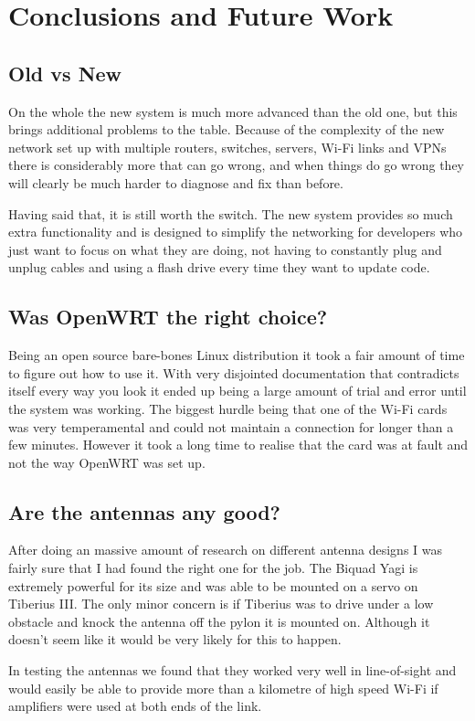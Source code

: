 \section{Conclusions and Future Work}
\subsection{Old vs New}
On the whole the new system is much more advanced than the old one, but this brings additional problems to the table. Because of the complexity of the new network set up with multiple routers, switches, servers, Wi-Fi links and VPNs there is considerably more that can go wrong, and when things do go wrong they will clearly be much harder to diagnose and fix than before.

Having said that, it is still worth the switch. The new system provides so much extra functionality and is designed to simplify the networking for developers who just want to focus on what they are doing, not having to constantly plug and unplug cables and using a flash drive every time they want to update code. 

\subsection{Was OpenWRT the right choice?}
Being an open source bare-bones Linux distribution it took a fair amount of time to figure out how to use it. With very disjointed documentation that contradicts itself every way you look it ended up being a large amount of trial and error until the system was working. The biggest hurdle being that one of the Wi-Fi cards was very temperamental and could not maintain a connection for longer than a few minutes. However it took a long time to realise that the card was at fault and not the way OpenWRT was set up.

\subsection{Are the antennas any good?}
After doing an massive amount of research on different antenna designs I was fairly sure that I had found the right one for the job. The Biquad Yagi is extremely powerful for its size and was able to be mounted on a servo on Tiberius III. The only minor concern is if Tiberius was to drive under a low obstacle and knock the antenna off the pylon it is mounted on. Although it doesn't seem like it would be very likely for this to happen.

In testing the antennas we found that they worked very well in line-of-sight and would easily be able to provide more than a kilometre of high speed Wi-Fi if amplifiers were used at both ends of the link.

